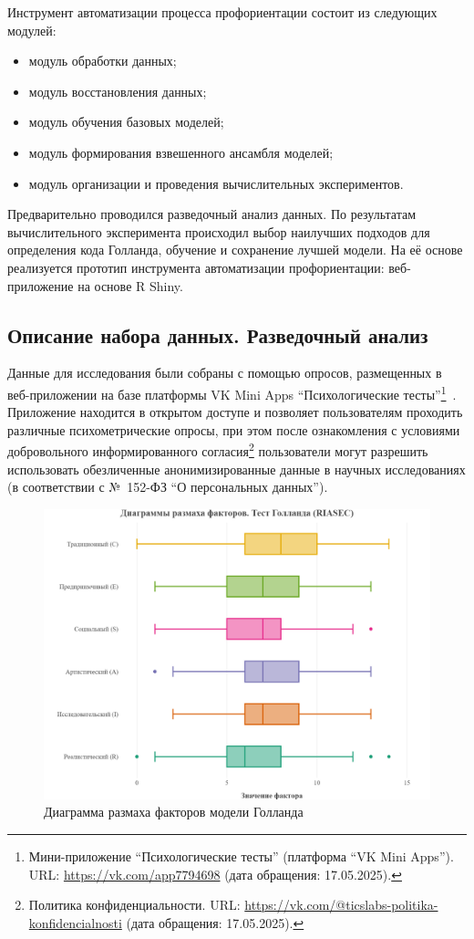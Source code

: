 Инструмент автоматизации процесса профориентации состоит из следующих модулей:
\begin{itemize}
    \item модуль обработки данных;
    \item модуль восстановления данных;
    \item модуль обучения базовых моделей;
    \item модуль формирования взвешенного ансамбля моделей;
    \item модуль организации и проведения вычислительных экспериментов.
\end{itemize}
Предварительно проводился разведочный анализ данных. По результатам вычислительного эксперимента происходил выбор наилучших подходов для определения кода Голланда, обучение и сохранение лучшей модели. На её основе реализуется прототип инструмента автоматизации профориентации: веб-приложение на основе R Shiny.


\subsection{Описание набора данных. Разведочный анализ}

Данные для исследования были собраны с помощью опросов, размещенных в веб-приложении на базе платформы VK Mini Apps \enquote{Психологические тесты}\footnote{\quad Мини-приложение \enquote{Психологические тесты} (платформа \enquote{VK Mini Apps}). URL: \url{https://vk.com/app7794698} (дата обращения: 17.05.2025).}~\cite{vk_psychotests}. Приложение находится в открытом доступе и позволяет пользователям проходить различные психометрические опросы, при этом после ознакомления с условиями добровольного информированного согласия\footnote{\quad Политика конфиденциальности. URL: \url{https://vk.com/@ticslabs-politika-konfidencialnosti} (дата обращения: 17.05.2025).} пользователи могут разрешить использовать обезличенные анонимизированные данные в научных исследованиях (в соответствии с №~152-ФЗ \enquote{О персональных данных}).

\begin{figure}[bhtp]
    \centering
    \includegraphics[width=0.75\linewidth]{figures/HL.png}
    \caption{Диаграмма размаха факторов модели Голланда}
    \label{fig:HL_boxplot}
\end{figure}

